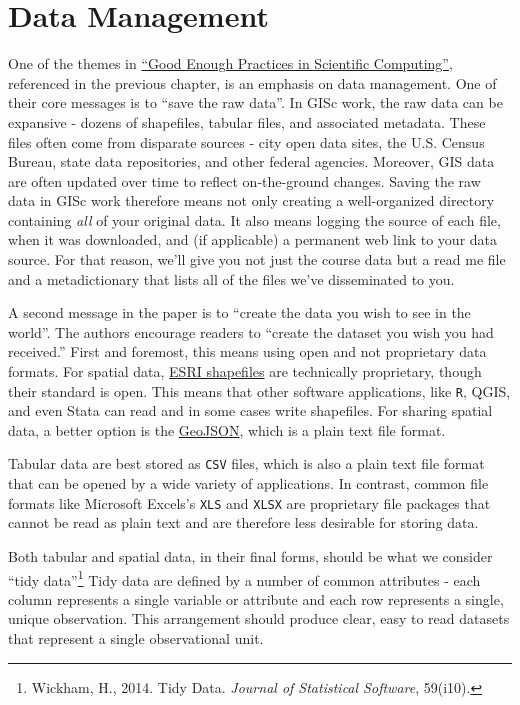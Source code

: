 \documentclass[]{book}
\let\rmarkdownfootnote\footnote%
\def\footnote{\protect\rmarkdownfootnote}
\begin{document}
\section{Data Management}\label{data-management}

One of the themes in \href{https://arxiv.org/abs/1609.00037}{``Good
Enough Practices in Scientific Computing''}, referenced in the previous
chapter, is an emphasis on data management. One of their core messages
is to ``save the raw data''. In GISc work, the raw data can be expansive
- dozens of shapefiles, tabular files, and associated metadata. These
files often come from disparate sources - city open data sites, the U.S.
Census Bureau, state data repositories, and other federal agencies.
Moreover, GIS data are often updated over time to reflect on-the-ground
changes. Saving the raw data in GISc work therefore means not only
creating a well-organized directory containing \emph{all} of your
original data. It also means logging the source of each file, when it
was downloaded, and (if applicable) a permanent web link to your data
source. For that reason, we'll give you not just the course data but a
read me file and a metadictionary that lists all of the files we've
disseminated to you.

A second message in the paper is to ``create the data you wish to see in
the world''. The authors encourage readers to ``create the dataset you
wish you had received.'' First and foremost, this means using open and
not proprietary data formats. For spatial data,
\href{https://en.wikipedia.org/wiki/Shapefile}{ESRI shapefiles} are
technically proprietary, though their standard is open. This means that
other software applications, like \texttt{R}, QGIS, and even Stata can
read and in some cases write shapefiles. For sharing spatial data, a
better option is the
\href{https://en.wikipedia.org/wiki/GeoJSON}{GeoJSON}, which is a plain
text file format.

Tabular data are best stored as \texttt{CSV} files, which is also a
plain text file format that can be opened by a wide variety of
applications. In contrast, common file formats like Microsoft Excels's
\texttt{XLS} and \texttt{XLSX} are proprietary file packages that cannot
be read as plain text and are therefore less desirable for storing data.

Both tabular and spatial data, in their final forms, should be what we
consider ``tidy data''\footnote{Wickham, H., 2014. Tidy Data.
  \emph{Journal of Statistical Software}, 59(i10).} Tidy data are
defined by a number of common attributes - each column represents a
single variable or attribute and each row represents a single, unique
observation. This arrangement should produce clear, easy to read
datasets that represent a single observational unit.
\end{document}
